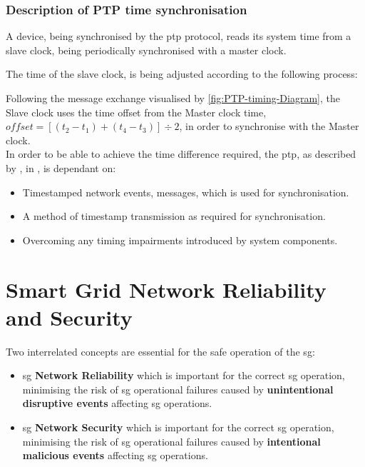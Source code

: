 \subsubsection{Description of PTP time synchronisation}



A device, being synchronised  by the \acrshort{ptp} protocol, reads its system time from a slave clock, being periodically synchronised with a master clock.


The time of the slave clock, is being adjusted according to the following process:


Following the message exchange visualised by \figureautorefname { } \ref{fig:PTP-timing-Diagram}, the Slave clock  uses the time offset from the Master clock time, $offset = [(t_2 - t_1) + (t_4 - t_3)]\div 2$, in order to synchronise with the Master clock. \\ 

In order to be able to achieve the time difference required, the \acrshort{ptp}, as described by  \citeauthor{Eidson2006}, in \cite{Eidson2006}, is dependant on:

\begin{itemize}
    \item Timestamped network events, messages, which is  used for synchronisation.
    \item A method of timestamp transmission as required for synchronisation.
    \item Overcoming any timing impairments introduced by system components.
\end{itemize}

\section{Smart Grid Network Reliability and Security}

Two interrelated concepts are essential for the safe operation of the \acrshort{sg}:  
\begin{itemize}
    \item \acrlong{sg} \textbf{Network Reliability } which is important for the correct \acrshort{sg} operation, minimising the risk of \acrshort{sg} operational failures caused by \textbf{unintentional disruptive events} affecting \acrshort{sg} operations.
    
    \item \acrlong{sg} \textbf{Network Security}  which is important for the correct \acrshort{sg} operation, minimising the risk of \acrshort{sg} operational failures caused by \textbf{intentional malicious events}  affecting \acrshort{sg} operations.
\end{itemize}



